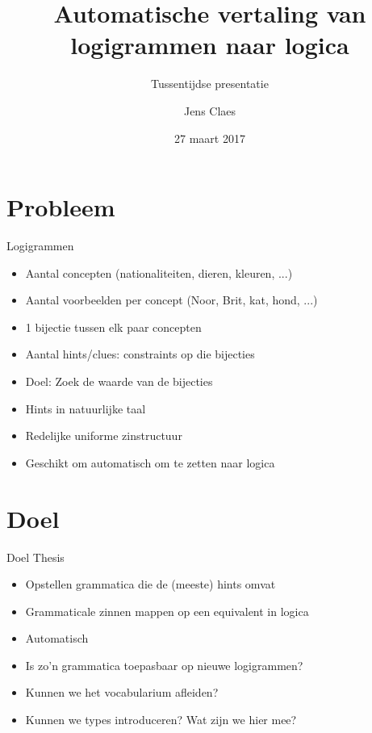 \documentclass[notes, dvipsnames]{beamer}
\title{Automatische vertaling van logigrammen naar logica}
\subtitle{Tussentijdse presentatie}
\author{Jens Claes}
\date{27 maart 2017}
\newcommand{\seperation}{
	\vspace{1em}
	\ppause
}
\newcommand{\hitem}{
	\ppause
	\item
}
\newcommand{\ppause}{\onslide<+>}
\begin{document}
	\frame{\titlepage}
	\section{Probleem}
	\begin{frame}{Logigrammen}
		\begin{itemize}
      \hitem Aantal concepten (nationaliteiten, dieren, kleuren, ...)
      \item Aantal voorbeelden per concept (Noor, Brit, kat, hond, ...)
      \item 1 bijectie tussen elk paar concepten
      \item Aantal hints/clues: constraints op die bijecties
			\hitem Doel: Zoek de waarde van de bijecties
			
			\seperation
			
			\item Hints in natuurlijke taal
      \item Redelijke uniforme zinstructuur
			
			\seperation

      \item Geschikt om automatisch om te zetten naar logica
		\end{itemize}
	\end{frame}
	
	\section{Doel}
	\begin{frame}{Doel Thesis}
		\begin{itemize}
			\hitem Opstellen grammatica die de (meeste) hints omvat
			\item Grammaticale zinnen mappen op een equivalent in logica
      \item Automatisch
			
			\seperation
      \item Is zo'n grammatica toepasbaar op nieuwe logigrammen?
      \item Kunnen we het vocabularium afleiden?
      \item Kunnen we types introduceren? Wat zijn we hier mee?
		\end{itemize}
	\end{frame}
\end{document}
